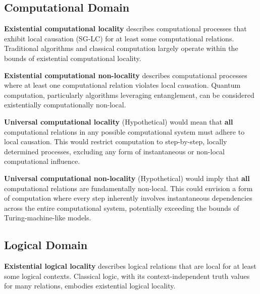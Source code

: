 	\subsection{Computational Domain}
	
	\begin{definition}
		\textbf{Existential computational locality} describes computational processes that exhibit local causation (SG-LC) for at least some computational relations.  Traditional algorithms and classical computation largely operate within the bounds of existential computational locality.
	\end{definition}
	
	\begin{definition}
		\textbf{Existential computational non-locality} describes computational processes where at least one computational relation violates local causation. Quantum computation, particularly algorithms leveraging entanglement, can be considered existentially computationally non-local.
	\end{definition}
	
	\begin{definition}
		\textbf{Universal computational locality} (Hypothetical) would mean that \textbf{all} computational relations in any possible computational system must adhere to local causation. This would restrict computation to step-by-step, locally determined processes, excluding any form of instantaneous or non-local computational influence.
	\end{definition}
	
	\begin{definition}
		\textbf{Universal computational non-locality} (Hypothetical) would imply that \textbf{all} computational relations are fundamentally non-local.  This could envision a form of computation where every step inherently involves instantaneous dependencies across the entire computational system, potentially exceeding the bounds of Turing-machine-like models.
	\end{definition}
	
	\subsection{Logical Domain}
	
	\begin{definition}
		\textbf{Existential logical locality} describes logical relations that are local for at least some logical contexts. Classical logic, with its context-independent truth values for many relations, embodies existential logical locality.
	\end{definition}
	
